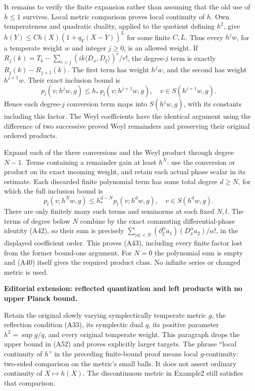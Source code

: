 \documentclass[
  11pt,
]{article}
\begin{document}
It remains to verify the finite expansion rather than assuming that the
old use of \(h\le1\) survives. Local metric comparison proves local
continuity of \(h\). Own temperateness and quadratic duality, applied to
the quotient defining \(h^2\), give \(h(Y)\le C h(X)(1+q_Y(X-Y))^L\) for
some finite \(C,L\). Thus every \(h^j w\), for a temperate weight \(w\)
and integer \(j\ge0\), is an allowed weight. If
\(R_j(k)=T_k-\sum_{r<j}(ik\langle D_x,D_\xi\rangle)^r/r!\), the
degree-\(j\) term is exactly \(R_j(k)-R_{j+1}(k)\). The first term has
weight \(h^jw\), and the second has weight \(h^{j+1}w\). Their exact
inclusion bound is \[
 p_l(v;h^jw,g)\le h_*\,p_l(v;h^{j+1}w,g),
 \quad v\in S(h^{j+1}w,g).
 \tag{A54}
\] Hence each degree-\(j\) conversion term maps into \(S(h^jw,g)\), with
its constants including this factor. The Weyl coefficients have the
identical argument using the difference of two successive proved Weyl
remainders and preserving their original ordered products.

Expand each of the three conversions and the Weyl product through degree
\(N-1\). Terms containing a remainder gain at least \(h^N\): use the
conversion or product on its exact incoming weight, and retain each
actual phase scalar in its estimate. Each discarded finite polynomial
term has some total degree \(d\ge N\), for which the full inclusion
bound is \[
 p_l(v;h^Nw,g)\le h_*^{d-N}p_l(v;h^dw,g),
 \quad v\in S(h^dw,g).
 \tag{A55}
\] There are only finitely many such terms and seminorms at each fixed
\(N,l\). The terms of degree below \(N\) combine by the exact commuting
differential-phase identity (A42), so their sum is precisely
\(\sum_{|\alpha|<N}(\partial_\xi^\alpha a_1)(D_x^\alpha a_2)/\alpha!\),
in the displayed coefficient order. This proves (A43), including every
finite factor lost from the former bound-one argument. For \(N=0\) the
polynomial sum is empty and (A40) itself gives the required product
class. No infinite series or changed metric is used.

\textbf{Editorial extension: reflected quantization and left products
with no upper Planck bound.}

Retain the original slowly varying symplectically temperate metric
\(g\), the reflection condition (A33), its symplectic dual \(q\), its
positive parameter \(h^2=\sup g/q\), and every original temperate
weight. This paragraph drops the upper bound in (A52) and proves
explicitly larger targets. The phrase ``local continuity of \(h\)'' in
the preceding finite-bound proof means local \(g\)-continuity: two-sided
comparison on the metric's small balls. It does not assert ordinary
continuity of \(X\mapsto h(X)\). The discontinuous metric in Example2
still satisfies that comparison.
\end{document}
